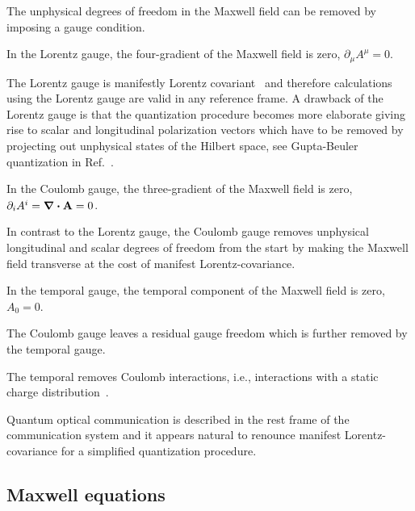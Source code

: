 The unphysical degrees of freedom in the Maxwell field can be removed by imposing a gauge condition.
\begin{definition}
	In the Lorentz gauge, the four-gradient of the Maxwell field is zero, $\partial_\mu A^\mu=0$.
\end{definition}
The Lorentz gauge is manifestly Lorentz covariant~\cite[p.~144]{Greiner2013} and therefore calculations using the Lorentz gauge are valid in any reference frame.
A drawback of the Lorentz gauge is that the quantization procedure becomes more elaborate giving rise to scalar and longitudinal polarization vectors which have to be removed by projecting out unphysical states of the Hilbert space, see Gupta-Beuler quantization in Ref.~\cite[p.~180]{Greiner2013}.
\begin{definition}
	In the Coulomb gauge, the three-gradient of the Maxwell field is zero, $\partial_iA^i=\div\vb{A}=0$.
\end{definition}
In contrast to the Lorentz gauge, the Coulomb gauge removes unphysical longitudinal and scalar degrees of freedom from the start by making the Maxwell field transverse at the cost of manifest Lorentz-covariance.
\begin{definition}
	In the temporal gauge, the temporal component of the Maxwell field is zero, $A_0=0$.
\end{definition}
The Coulomb gauge leaves a residual gauge freedom which is further removed by the temporal gauge.
\begin{remark}
	The temporal removes Coulomb interactions, i.e., interactions with a static charge distribution~\cite[p.~200]{Greiner2013}.
\end{remark}

Quantum optical communication is described in the rest frame of the communication system and it appears natural to renounce manifest Lorentz-covariance for a simplified quantization procedure.

\subsection{Maxwell equations}

